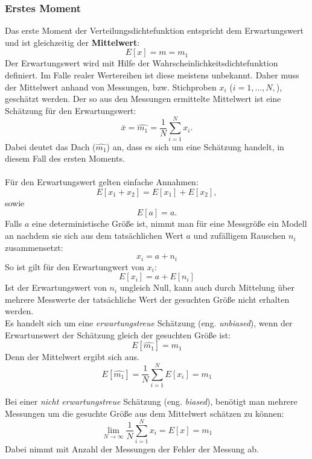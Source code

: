 \subsubsection*{Erstes Moment}
Das erste Moment der Verteilungsdichtefunktion entspricht dem Erwartungswert und ist gleichzeitig der \textbf{Mittelwert}:
\[
E[x]=m=m_1
\]
Der Erwartungswert wird mit Hilfe der Wahrscheinlichkeitsdichtefunktion definiert. Im Falle realer Wertereihen ist diese meistens unbekannt. Daher muss der Mittelwert anhand von Messungen, bzw. Stichproben $x_i$ ($i=1,\dots, N,$), geschätzt werden. Der so aus den Messungen ermittelte Mittelwert ist eine Schätzung für den Erwartungswert:
\begin{equation}
\bar{x} = \hat{m_1} = \frac{1}{N}\sum \limits_{i=1}^N x_i.
\end{equation}
Dabei deutet das Dach ($\hat{m_1}$) an, dass es sich um eine Schätzung handelt, in diesem Fall des ersten Moments.\\\\
Für den Erwartungswert gelten einfache Annahmen:
\[
E[x_1+x_2]=E[x_1]+E[x_2],
\]
sowie
\[
E[a]=a.
\]
Falls $a$ eine deterministische Größe ist, nimmt man für eine Messgröße ein Modell an nachdem sie sich aus dem tatsächlichen Wert $a$ und zufälligem Rauschen $n_i$  zusammensetzt:
\[
x_i = a + n_i
\]
So ist gilt für den Erwartungwert von $x_i$:
\[
E[x_i] = a + E[n_i]
\]
Ist der Erwartungswert von $n_i$ ungleich Null, kann auch durch Mittelung über mehrere Messwerte der tatsächliche Wert der gesuchten Größe nicht erhalten werden.\\

Es handelt sich um eine \textit{erwartungstreue} Schätzung (eng. \textsl{unbiased}), wenn der Erwartunswert der Schätzung gleich der gesuchten Größe ist:
\[
E[\hat{m_1} ]= m_1
\]
Denn der Mittelwert ergibt sich aus.
\[
E[\hat{m_1}] =\frac{1}{N}\sum \limits_{i=1}^N E[x_i] = m_1
\]

Bei einer \textit{nicht erwartungstreue} Schätzung (eng. \textsl{biased}), benötigt man mehrere Messungen um die gesuchte Größe aus dem Mittelwert schätzen zu können:
\[
\lim\limits_{N \to \infty}\frac{1}{N}\sum \limits_{i=1}^N x_i=E[x]=m_1
\]
Dabei nimmt mit Anzahl der Messungen der Fehler der Messung ab.

